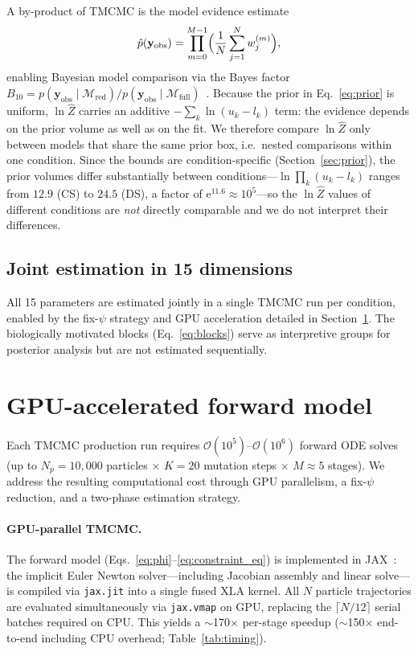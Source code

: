 \documentclass[11pt,a4paper]{article}
\newcommand{\yobs}{\mathbf{y}_{\mathrm{obs}}}
\begin{document}
A by-product of TMCMC is the model evidence estimate
\begin{equation}
\hat{p}(\yobs) = \prod_{m=0}^{M-1}\Bigl(\frac{1}{N}\sum_{j=1}^{N}w_j^{(m)}\Bigr),
\label{eq:evidence}
\end{equation}
enabling Bayesian model comparison via the Bayes factor $B_{10}=p(\yobs\mid\mathcal{M}_{\text{red}})/p(\yobs\mid\mathcal{M}_{\text{full}})$~\cite{KassRaftery1995BayesFactor}.
Because the prior in Eq.~\eqref{eq:prior} is uniform, $\ln\hat{Z}$ carries an additive $-\sum_k\ln(u_k-l_k)$ term: the evidence depends on the prior volume as well as on the fit.
We therefore compare $\ln\hat{Z}$ only between models that share the same prior box, i.e.\ nested comparisons within one condition.
Since the bounds are condition-specific (Section~\ref{sec:prior}), the prior volumes differ substantially between conditions---$\ln\prod_k(u_k-l_k)$ ranges from $12.9$ (CS) to $24.5$ (DS), a factor of $\mathrm{e}^{11.6}\approx10^{5}$---so the $\ln\hat{Z}$ values of different conditions are \emph{not} directly comparable and we do not interpret their differences.

\subsection{Joint estimation in 15 dimensions}

All 15 parameters are estimated jointly in a single TMCMC run per condition, enabled by the fix-$\psi$ strategy and GPU acceleration detailed in Section~\ref{sec:gpu}.
The biologically motivated blocks (Eq.~\ref{eq:blocks}) serve as interpretive groups for posterior analysis but are not estimated sequentially.


\section{GPU-accelerated forward model}
\label{sec:gpu}

Each TMCMC production run requires $\mathcal{O}(10^5)$--$\mathcal{O}(10^6)$ forward ODE solves (up to $N_p=10{,}000$ particles $\times$ $K=20$ mutation steps $\times$ $M\approx5$ stages).
We address the resulting computational cost through GPU parallelism, a fix-$\psi$ reduction, and a two-phase estimation strategy.

\paragraph{GPU-parallel TMCMC.}
The forward model (Eqs.~\ref{eq:phi}--\ref{eq:constraint_eq}) is implemented in JAX~\cite{jax2018github}: the implicit Euler Newton solver---including Jacobian assembly and linear solve---is compiled via \texttt{jax.jit} into a single fused XLA kernel.
All $N$ particle trajectories are evaluated simultaneously via \texttt{jax.vmap} on GPU, replacing the $\lceil N/12\rceil$ serial batches required on CPU.
This yields a $\sim$170$\times$ per-stage speedup ($\sim$150$\times$ end-to-end including CPU overhead; Table~\ref{tab:timing}).
\end{document}
